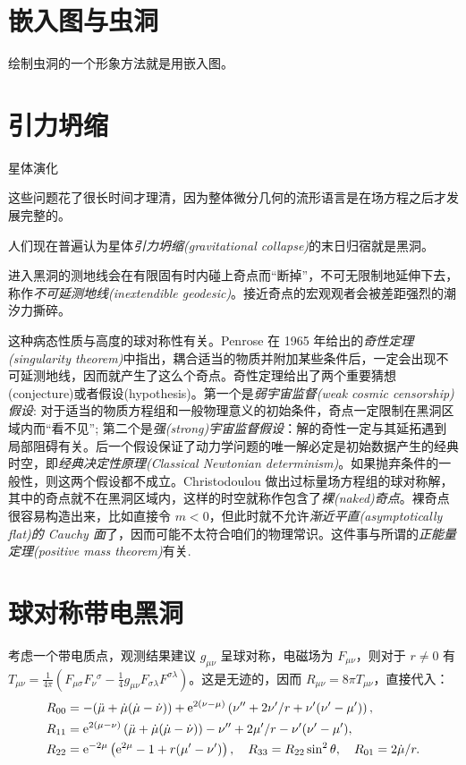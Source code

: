 \section{嵌入图与虫洞}
绘制虫洞的一个形象方法就是用嵌入图。


\section{引力坍缩}\label{sec:collapse}

星体演化

这些问题花了很长时间才理清，因为整体微分几何的流形语言是在场方程之后才发展完整的。

人们现在普遍认为星体\textit{引力坍缩(gravitational collapse)}的末日归宿就是黑洞。

进入黑洞的测地线会在有限固有时内碰上奇点而“断掉”，不可无限制地延伸下去，称作\textit{不可延测地线(inextendible geodesic)}。接近奇点的宏观观者会被差距强烈的潮汐力撕碎。

这种病态性质与高度的球对称性有关。Penrose 在 1965 年给出的\textit{奇性定理(singularity theorem)}中指出，耦合适当的物质并附加某些条件后，一定会出现不可延测地线，因而就产生了这么个奇点。奇性定理给出了两个重要猜想(conjecture)或者假设(hypothesis)。第一个是\textit{弱宇宙监督(weak cosmic censorship)假设}: 对于适当的物质方程组和一般物理意义的初始条件，奇点一定限制在黑洞区域内而“看不见”; 第二个是\textit{强(strong)宇宙监督假设}：解的奇性一定与其延拓遇到局部阻碍有关。后一个假设保证了动力学问题的唯一解必定是初始数据产生的经典时空，即\textit{经典决定性原理(Classical Newtonian determinism)}。如果抛弃条件的一般性，则这两个假设都不成立。Christodoulou 做出过标量场方程组的球对称解，其中的奇点就不在黑洞区域内，这样的时空就称作包含了\textit{裸(naked)奇点}。裸奇点很容易构造出来，比如直接令 $m<0$，但此时就不允许\textit{渐近平直(asymptotically flat)的 Cauchy 面}了，因而可能不太符合咱们的物理常识。这件事与所谓的\textit{正能量定理(positive mass theorem)}有关.

\section{球对称带电黑洞}


考虑一个带电质点，观测结果建议 $g_{\mu\nu}$ 呈球对称，电磁场为 $F_{\mu\nu}$，则对于 $r\ne 0$ 有 $T_{\mu\nu} = \frac{1}{4\pi}\left(F_{\mu\sigma}F_{\nu}{}^{\sigma}-\frac{1}{4}g_{\mu\nu} F_{\sigma\lambda}F^{\sigma\lambda}\right)$。这是无迹的，因而 $R_{\mu\nu} = 8\pi T_{\mu\nu}$，直接代入：
\begin{align*}
    R_{00} &= -(\ddot\mu+\dot\mu(\dot\mu-\dot\nu))+\mathrm{e}^{2(\nu-\mu)} \left(\nu''+2\nu'/r+\nu'(\nu'-\mu')\right), \\
    R_{11} &= \mathrm{e}^{2(\mu-\nu)} \left(\ddot\mu+\dot\mu(\dot\mu-\dot\nu)\right)-\nu''+2\mu'/r-\nu'(\nu'-\mu'), \\
    R_{22} &= \mathrm{e}^{-2\mu} \left(\mathrm{e}^{2\mu}-1+r(\mu'-\nu')\right), \quad R_{33} = R_{22} \sin ^2 \theta,\quad R_{01} = 2\dot\mu/r.
\end{align*}

